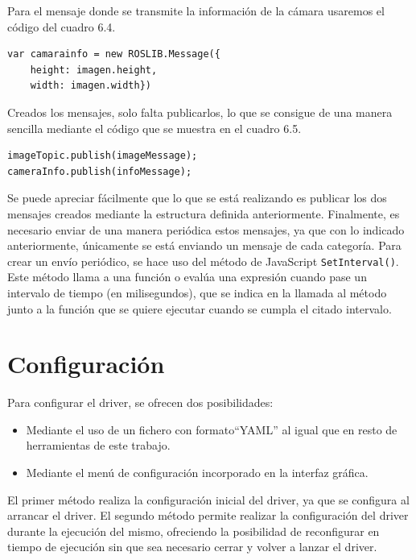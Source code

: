 Para el mensaje donde se transmite la información de la cámara usaremos el código del cuadro 6.4.

\begin{lstlisting}[caption= Definición del mensaje para la información de la cámara, label=cod.definicionmensajeinfo]
var camarainfo = new ROSLIB.Message({
	height: imagen.height,
	width: imagen.width})

\end{lstlisting}
Creados los mensajes, solo falta publicarlos, lo que se consigue de una manera sencilla mediante el código que se muestra en el cuadro 6.5.
\begin{lstlisting}[frame=single]
imageTopic.publish(imageMessage);
cameraInfo.publish(infoMessage);
\end{lstlisting}

Se puede apreciar fácilmente que lo que se está realizando es publicar los dos mensajes creados mediante la estructura definida anteriormente. 
Finalmente, es necesario enviar de una manera periódica estos mensajes, ya que con lo indicado anteriormente, únicamente se está enviando un mensaje de cada categoría. 
Para crear un envío periódico, se hace uso del método de JavaScript \texttt{SetInterval()}. Este método llama a una función o evalúa una expresión cuando pase un intervalo de tiempo (en milisegundos), que se indica en la llamada al método junto a la función que se quiere ejecutar cuando se cumpla el citado intervalo.

\section{Configuración}
Para configurar el driver, se ofrecen dos posibilidades:
\begin{itemize}
\item Mediante el uso de un fichero con formato``YAML'' al igual que en resto de herramientas de este trabajo. 
\item Mediante el menú de configuración incorporado en la interfaz gráfica.
\end{itemize}
El primer método realiza la configuración inicial del driver, ya que se configura al arrancar el driver. El segundo método permite realizar la configuración del driver durante la ejecución del mismo, ofreciendo la posibilidad de reconfigurar en tiempo de ejecución sin que sea necesario cerrar y volver a lanzar el driver.

